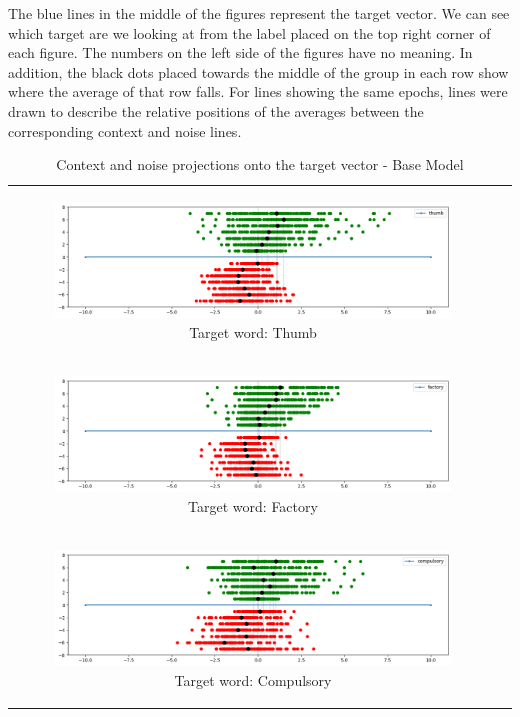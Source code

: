 The blue lines in the middle of the figures represent the target vector. We can see which target are we looking at from the label placed on the top right corner of each figure. The numbers on the left side of the figures have no meaning. In addition, the black dots placed towards the middle of the group in each row show where the average of that row falls. For lines showing the same epochs, lines were drawn to describe the relative positions of the averages between the corresponding context and noise lines. 

\begin{table}[p]
  \centering
  \begin{tabular}{cc}
    \begin{subfigure}{0.95\textwidth}
      \includegraphics[width=\linewidth]{img/thumb_base.png}
      \caption{Target word: Thumb}
    \end{subfigure} \\
    \begin{subfigure}{0.95\textwidth}
      \includegraphics[width=\linewidth]{img/factory_base.png}
      \caption{Target word: Factory}
    \end{subfigure} \\
    \begin{subfigure}{0.95\textwidth}
      \includegraphics[width=\linewidth]{img/compulsory_base.png}
      \caption{Target word: Compulsory}
    \end{subfigure} 
  \end{tabular}
  \caption{Context and noise projections onto the target vector - Base Model}
  \label{tab:base_projections}
\end{table}


